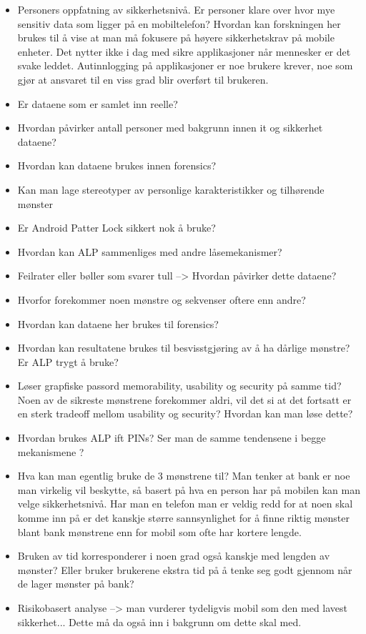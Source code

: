 	\begin{itemize}
		\item Personers oppfatning av sikkerhetsnivå. Er personer klare over hvor mye sensitiv data som ligger på en mobiltelefon? Hvordan kan forskningen her brukes til å vise at man må fokusere på høyere sikkerhetskrav på mobile enheter. Det nytter ikke i dag med sikre applikasjoner når mennesker er det svake leddet. Autinnlogging på applikasjoner er noe brukere krever, noe som gjør at ansvaret til en viss grad blir overført til brukeren.
		\item Er dataene som er samlet inn reelle? 
		\item Hvordan påvirker antall personer med bakgrunn innen it og sikkerhet dataene?
		\item Hvordan kan dataene brukes innen forensics?
		\item Kan man lage stereotyper av personlige karakteristikker og tilhørende mønster
		\item Er Android Patter Lock sikkert nok å bruke?
		\item Hvordan kan ALP sammenliges med andre låsemekanismer?
		\item Feilrater eller bøller som svarer tull --> Hvordan påvirker dette dataene?
		\item Hvorfor forekommer noen mønstre og sekvenser oftere enn andre?
		\item Hvordan kan dataene her brukes til forensics?
		\item Hvordan kan resultatene brukes til besvisstgjøring av å ha dårlige mønstre? Er ALP trygt å bruke?
		\item Løser grapfiske passord memorability, usability og security på samme tid? Noen av de sikreste mønstrene forekommer aldri, vil det si at det fortsatt er en sterk tradeoff mellom usability og security? Hvordan kan man løse dette?
		\item Hvordan brukes ALP ift PINs? Ser man de samme tendensene i begge mekanismene ?
		\item Hva kan man egentlig bruke de 3 mønstrene til? Man tenker at bank er noe man virkelig vil beskytte, så basert på hva en person har på mobilen kan man velge sikkerhetsnivå. Har man en telefon man er veldig redd for at noen skal komme inn på er det kanskje større sannsynlighet for å finne riktig mønster blant bank mønstrene enn for mobil som ofte har kortere lengde. 
		\item Bruken av tid korresponderer i noen grad også kanskje med lengden av mønster? Eller bruker brukerene ekstra tid på å tenke seg godt gjennom når de lager mønster på bank?
		\item Risikobasert analyse --> man vurderer tydeligvis mobil som den med lavest sikkerhet... Dette må da også inn i bakgrunn om dette skal med.
	\end{itemize}
